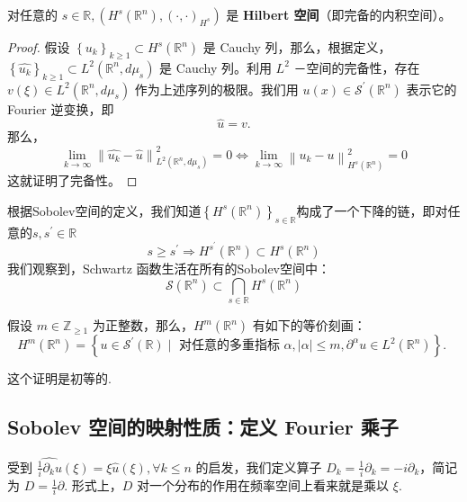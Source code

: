 \begin{theorem}
对任意的 $s \in \mathbb{R},\left(H^s\left(\mathbb{R}^n\right),(\cdot, \cdot)_{H^s}\right)$ 是 \textbf{Hilbert 空间}（即完备的内积空间）。
\end{theorem}
\begin{proof}
假设 $\left\{u_k\right\}_{k \geqslant 1} \subset H^s\left(\mathbb{R}^n\right)$ 是 Cauchy 列，那么，根据定义，$\left\{\widehat{u_k}\right\}_{k \geqslant 1} \subset L^2\left(\mathbb{R}^n, d \mu_s\right)$ 是 Cauchy 列。利用 $L^2$ －空间的完备性，存在 $v(\xi) \in L^2\left(\mathbb{R}^n, d \mu_s\right)$ 作为上述序列的极限。我们用 $u(x) \in \mathcal{S}^{\prime}\left(\mathbb{R}^n\right)$ 表示它的 Fourier 逆变换，即
\[
\widehat{u}=v .
\]
那么，
\[
\lim _{k \rightarrow \infty}\left\|\widehat{u_k}-\widehat{u}\right\|_{L^2\left(\mathbb{R}^n, d \mu_s\right)}^2=0 \Leftrightarrow \lim _{k \rightarrow \infty}\left\|u_k-u\right\|_{H^s\left(\mathbb{R}^n\right)}^2=0
\]
这就证明了完备性。
\end{proof}

根据Sobolev空间的定义，我们知道$\left\{H^s\left(\mathbb{R}^n\right)\right\}_{s \in \mathbb{R}}$构成了一个下降的链，即对任意的$s, s^{\prime} \in \mathbb{R}$
\[
s \geqslant s^{\prime} \Rightarrow H^{s^{\prime}}\left(\mathbb{R}^n\right) \subset H^s\left(\mathbb{R}^n\right)
\]
我们观察到，Schwartz 函数生活在所有的Sobolev空间中：
\[
\mathcal{S}\left(\mathbb{R}^n\right) \subset \bigcap_{s \in \mathbb{R}} H^s\left(\mathbb{R}^n\right)
\]
\begin{proposition}
假设 $m \in \mathbb{Z}_{\geqslant 1}$ 为正整数，那么，$H^m\left(\mathbb{R}^n\right)$ 有如下的等价刻画：
\[
H^m\left(\mathbb{R}^n\right)=\left\{u \in \mathcal{S}^{\prime}(\mathbb{R}) \mid \text { 对任意的多重指标 } \alpha,|\alpha| \leqslant m, \partial^\alpha u \in L^2\left(\mathbb{R}^n\right)\right\} \text {. }
\]
\end{proposition}
这个证明是初等的.

\subsection{Sobolev 空间的映射性质：定义 Fourier 乘子}

受到 $\widehat{\frac{1}{i}\partial _ku}(\xi)=\xi \widehat{u}(\xi),\forall k\leq n$ 的启发，我们定义算子 $D_k=\frac{1}{i}\partial _k=-i\partial _k$，简记为 $D=\frac{1}{i}\partial$. 形式上，$D$ 对一个分布的作用在频率空间上看来就是乘以 $\xi$.

